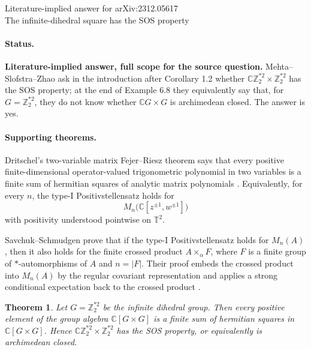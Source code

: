 \documentclass[11pt]{article}
\newtheorem*{theorem}{Theorem}
\newcommand{\C}{\mathbb C}
\newcommand{\Z}{\mathbb Z}
\begin{document}
\begin{center}
{\Large Literature-implied answer for arXiv:2312.05617}\\[0.5em]
{\large The infinite-dihedral square has the SOS property}
\end{center}

\paragraph{Status.}
\textbf{Literature-implied answer, full scope for the source question.}
Mehta--Slofstra--Zhao ask in the introduction after Corollary 1.2 whether
\(\C\Z_2^{*2}\times \Z_2^{*2}\) has the SOS property; at the end of Example 6.8
they equivalently say that, for \(G=\Z_2^{*2}\), they do not know whether
\(\C G\times G\) is archimedean closed. The answer is yes.

\paragraph{Supporting theorems.}
Dritschel's two-variable matrix Fejer--Riesz theorem says that every positive
finite-dimensional operator-valued trigonometric polynomial in two variables is
a finite sum of hermitian squares of analytic matrix polynomials
\cite[Introduction theorem]{Dritschel2024}. Equivalently, for every \(n\),
the type-I Positivstellensatz holds for
\[
M_n\bigl(\C[z^{\pm1},w^{\pm1}]\bigr)
\]
with positivity understood pointwise on \(\mathbb T^2\).

Savchuk--Schmudgen prove that if the type-I Positivstellensatz holds for
\(M_n(A)\), then it also holds for the finite crossed product
\(A\times_\alpha F\), where \(F\) is a finite group of \(*\)-automorphisms of
\(A\) and \(n=|F|\). Their proof embeds the crossed product into \(M_n(A)\)
by the regular covariant representation and applies a strong conditional
expectation back to the crossed product \cite[Section 5, Theorem 3]{SS2010}.

\begin{theorem}
Let \(G=\Z_2^{*2}\) be the infinite dihedral group. Then every positive element
of the group algebra \(\C[G\times G]\) is a finite sum of hermitian squares in
\(\C[G\times G]\). Hence \(\C\Z_2^{*2}\times \Z_2^{*2}\) has the SOS property,
or equivalently is archimedean closed.
\end{theorem}
\end{document}
